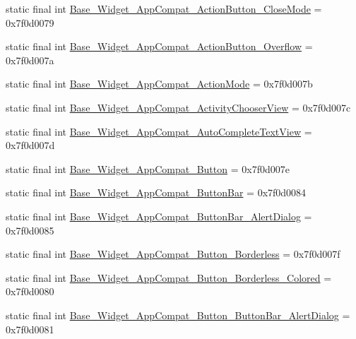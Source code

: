 \begin{DoxyCompactItemize}
static final int \mbox{\hyperlink{classandroid_1_1support_1_1v7_1_1appcompat_1_1R_1_1style_a92cb61a7ba81c923c135814c99b115ec}{Base\+\_\+\+Widget\+\_\+\+App\+Compat\+\_\+\+Action\+Button\+\_\+\+Close\+Mode}} = 0x7f0d0079
\item 
static final int \mbox{\hyperlink{classandroid_1_1support_1_1v7_1_1appcompat_1_1R_1_1style_ac6f65da34073ebe5e8c6d51f5d952d38}{Base\+\_\+\+Widget\+\_\+\+App\+Compat\+\_\+\+Action\+Button\+\_\+\+Overflow}} = 0x7f0d007a
\item 
static final int \mbox{\hyperlink{classandroid_1_1support_1_1v7_1_1appcompat_1_1R_1_1style_a714062b6eda38c04eaa0ecc46419e4de}{Base\+\_\+\+Widget\+\_\+\+App\+Compat\+\_\+\+Action\+Mode}} = 0x7f0d007b
\item 
static final int \mbox{\hyperlink{classandroid_1_1support_1_1v7_1_1appcompat_1_1R_1_1style_a763df5f9b4377366ab96cdddb07b074b}{Base\+\_\+\+Widget\+\_\+\+App\+Compat\+\_\+\+Activity\+Chooser\+View}} = 0x7f0d007c
\item 
static final int \mbox{\hyperlink{classandroid_1_1support_1_1v7_1_1appcompat_1_1R_1_1style_aba92e3e484b4dac3d7519aaf47a1a941}{Base\+\_\+\+Widget\+\_\+\+App\+Compat\+\_\+\+Auto\+Complete\+Text\+View}} = 0x7f0d007d
\item 
static final int \mbox{\hyperlink{classandroid_1_1support_1_1v7_1_1appcompat_1_1R_1_1style_a44c66034ef099053a9495dc74b620071}{Base\+\_\+\+Widget\+\_\+\+App\+Compat\+\_\+\+Button}} = 0x7f0d007e
\item 
static final int \mbox{\hyperlink{classandroid_1_1support_1_1v7_1_1appcompat_1_1R_1_1style_adf27232a09e51af3ff01d1354d92428b}{Base\+\_\+\+Widget\+\_\+\+App\+Compat\+\_\+\+Button\+Bar}} = 0x7f0d0084
\item 
static final int \mbox{\hyperlink{classandroid_1_1support_1_1v7_1_1appcompat_1_1R_1_1style_a4cb110246229736e0218fa2daada9617}{Base\+\_\+\+Widget\+\_\+\+App\+Compat\+\_\+\+Button\+Bar\+\_\+\+Alert\+Dialog}} = 0x7f0d0085
\item 
static final int \mbox{\hyperlink{classandroid_1_1support_1_1v7_1_1appcompat_1_1R_1_1style_a7a9571105f3d848f8fa36375eb207033}{Base\+\_\+\+Widget\+\_\+\+App\+Compat\+\_\+\+Button\+\_\+\+Borderless}} = 0x7f0d007f
\item 
static final int \mbox{\hyperlink{classandroid_1_1support_1_1v7_1_1appcompat_1_1R_1_1style_a3cbad8f9ee80cc10c4bacbc0f8d6bff9}{Base\+\_\+\+Widget\+\_\+\+App\+Compat\+\_\+\+Button\+\_\+\+Borderless\+\_\+\+Colored}} = 0x7f0d0080
\item 
static final int \mbox{\hyperlink{classandroid_1_1support_1_1v7_1_1appcompat_1_1R_1_1style_a9fd13b4ad3ed54dbd97ebcde3b83adb1}{Base\+\_\+\+Widget\+\_\+\+App\+Compat\+\_\+\+Button\+\_\+\+Button\+Bar\+\_\+\+Alert\+Dialog}} = 0x7f0d0081

\end{DoxyCompactItemize}
